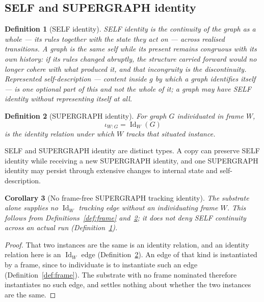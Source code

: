 \documentclass[11pt,a4paper]{article}
\newtheorem{definition}{Definition}[section]
\newtheorem{corollary}[definition]{Corollary}
\theoremstyle{remark}\newtheorem{remark}[definition]{Remark}
\begin{document}
\subsection{SELF and SUPERGRAPH identity}\label{sec:self-supergraph}
\begin{definition}[SELF identity]\label{def:self-identity}
SELF identity is the continuity of the graph as a whole --- its rules together with the state they
act on --- across realised transitions. A graph is the same self while its present remains
congruous with its own history: if its rules changed abruptly, the structure carried forward would
no longer cohere with what produced it, and that incongruity is the discontinuity. Represented
self-description --- content inside $g$ by which a graph identifies itself --- is one optional part
of this and not the whole of it; a graph may have SELF identity without representing itself at all.
\end{definition}
\begin{definition}[SUPERGRAPH identity]\label{def:supergraph-identity}
For graph $G$ individuated in frame $W$,
\[\iota_{W:G}=\operatorname{Id}_W(G)\]
is the identity relation under which $W$ tracks that situated instance.
\end{definition}
SELF and SUPERGRAPH identity are distinct types. A copy can preserve SELF identity while receiving a new SUPERGRAPH identity, and one SUPERGRAPH identity may persist through extensive changes to internal state and self-description.

\begin{corollary}[No frame-free SUPERGRAPH tracking identity]\label{thm:no-frame-free}
The substrate alone supplies no $\operatorname{Id}_W$ tracking edge without
an individuating frame $W$. This follows from Definitions~\ref{def:frame}
and~\ref{def:supergraph-identity}; it does not deny SELF continuity across an
actual run (Definition~\ref{def:self-identity}).
\end{corollary}
\begin{proof}
That two instances are the same is an identity relation, and an identity relation here is an
$\operatorname{Id}_W$ edge (Definition~\ref{def:supergraph-identity}). An edge of that kind is
instantiated by a frame, since to individuate is to instantiate such an edge
(Definition~\ref{def:frame}). The substrate with no frame nominated therefore
instantiates no such edge, and settles nothing about whether the two instances are the same.
\end{proof}
\end{document}
